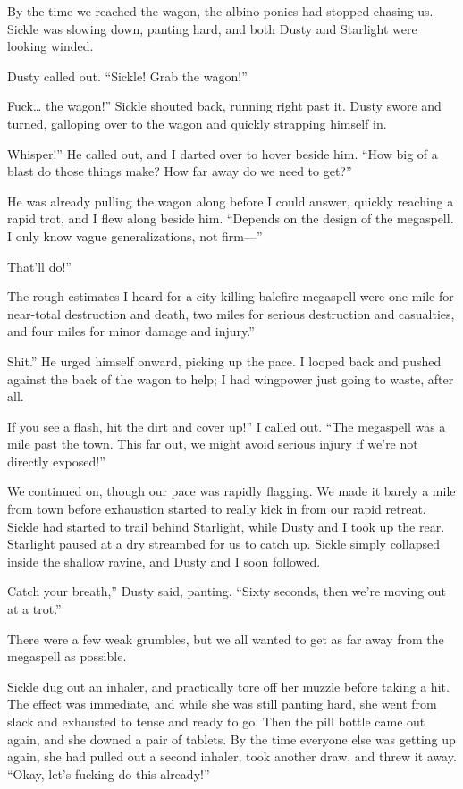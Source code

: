 By the time we reached the wagon, the albino ponies had stopped chasing us. Sickle was slowing down, panting hard, and both Dusty and Starlight were looking winded.

Dusty called out. “Sickle! Grab the wagon!”

\leavevmode{}Fuck… the wagon!” Sickle shouted back, running right past it. Dusty swore and turned, galloping over to the wagon and quickly strapping himself in.

\leavevmode{}Whisper!” He called out, and I darted over to hover beside him. “How big of a blast do those things make? How far away do we need to get?”

He was already pulling the wagon along before I could answer, quickly reaching a rapid trot, and I flew along beside him. “Depends on the design of the megaspell. I only know vague generalizations, not firm—”

\leavevmode{}That’ll do!”

\leavevmode{}The rough estimates I heard for a city-killing balefire megaspell were one mile for near-total destruction and death, two miles for serious destruction and casualties, and four miles for minor damage and injury.”

\leavevmode{}Shit.” He urged himself onward, picking up the pace. I looped back and pushed against the back of the wagon to help; I had wingpower just going to waste, after all.

\leavevmode{}If you see a flash, hit the dirt and cover up!” I called out. “The megaspell was a mile past the town. This far out, we might avoid serious injury if we’re not directly exposed!”

We continued on, though our pace was rapidly flagging. We made it barely a mile from town before exhaustion started to really kick in from our rapid retreat. Sickle had started to trail behind Starlight, while Dusty and I took up the rear. Starlight paused at a dry streambed for us to catch up. Sickle simply collapsed inside the shallow ravine, and Dusty and I soon followed.

\leavevmode{}Catch your breath,” Dusty said, panting. “Sixty seconds, then we’re moving out at a trot.”

There were a few weak grumbles, but we all wanted to get as far away from the megaspell as possible.

Sickle dug out an inhaler, and practically tore off her muzzle before taking a hit. The effect was immediate, and while she was still panting hard, she went from slack and exhausted to tense and ready to go. Then the pill bottle came out again, and she downed a pair of tablets. By the time everyone else was getting up again, she had pulled out a second inhaler, took another draw, and threw it away. “Okay, let’s fucking do this already!”

